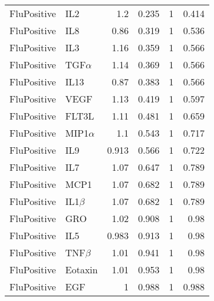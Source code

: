 \documentclass[10pt]{article}
\begin{document}
\begin{longtable}{llrrrr}
 FluPositive &           IL2 &   1.2 &    0.235 &       1 &   0.414 \\
 FluPositive &           IL8 &  0.86 &    0.319 &       1 &   0.536 \\
 FluPositive &           IL3 &  1.16 &    0.359 &       1 &   0.566 \\
 FluPositive &   TGF$\alpha$ &  1.14 &    0.369 &       1 &   0.566 \\
 FluPositive &          IL13 &  0.87 &    0.383 &       1 &   0.566 \\
 FluPositive &          VEGF &  1.13 &    0.419 &       1 &   0.597 \\
 FluPositive &         FLT3L &  1.11 &    0.481 &       1 &   0.659 \\
 FluPositive &  MIP1$\alpha$ &   1.1 &    0.543 &       1 &   0.717 \\
 FluPositive &           IL9 & 0.913 &    0.566 &       1 &   0.722 \\
 FluPositive &           IL7 &  1.07 &    0.647 &       1 &   0.789 \\
 FluPositive &          MCP1 &  1.07 &    0.682 &       1 &   0.789 \\
 FluPositive &    IL1$\beta$ &  1.07 &    0.682 &       1 &   0.789 \\
 FluPositive &           GRO &  1.02 &    0.908 &       1 &    0.98 \\
 FluPositive &           IL5 & 0.983 &    0.913 &       1 &    0.98 \\
 FluPositive &    TNF$\beta$ &  1.01 &    0.941 &       1 &    0.98 \\
 FluPositive &       Eotaxin &  1.01 &    0.953 &       1 &    0.98 \\
 FluPositive &           EGF &     1 &    0.988 &       1 &   0.988 \\
\end{longtable}
\end{document}
